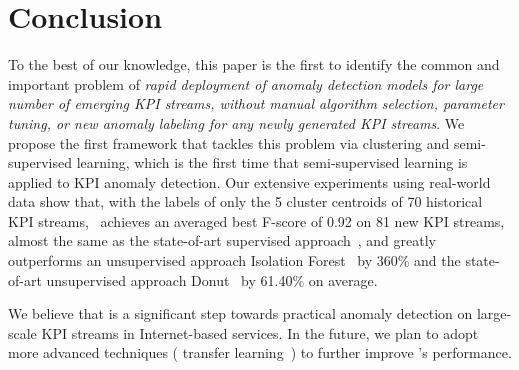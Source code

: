 \section{Conclusion}
\label{sec:conclusion}

 To the best of our knowledge, this paper is the first to identify the common and important problem of \textit{rapid deployment of anomaly detection models for large number of emerging KPI streams, without manual algorithm selection, parameter tuning, or new anomaly labeling for any newly generated KPI streams}. We propose the first framework \name{} that tackles this problem via clustering and semi-supervised learning, which is the first time that semi-supervised learning is applied to KPI anomaly detection. 
 Our extensive experiments using real-world data show that, with the labels of only the 5 cluster centroids of 70 historical KPI streams, \name~achieves an averaged best F-score of 0.92 on 81 new KPI streams, almost the same as the state-of-art supervised approach~\cite{liu2015opprentice}, and greatly outperforms an unsupervised approach Isolation Forest~\cite{zhang2018anomaly} by 360\% and the state-of-art unsupervised approach Donut~\cite{xu2018unsupervised} by 61.40\% on average.  
     
We believe that \name{} is a significant step towards practical anomaly detection on large-scale KPI streams in Internet-based services. In the future, we plan to adopt more advanced techniques (\EG{} transfer learning~\cite{pan2010survey}) to further improve \name{}'s performance.